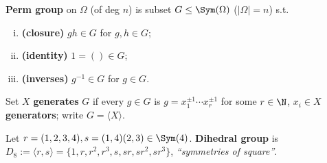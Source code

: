 \begin{slide}
    \begin{definition}
        \vspace{0pt}
        \textbf{Perm group} on $\Omega$ (of deg $n$) is subset $G \leq \Sym(\Omega)$ ($|\Omega| = n$) s.t.
        \begin{enumerate}[(i)]
            \item \textbf{(closure)} $gh \in G$ for $g,h \in G$; \pause
            \item \textbf{(identity)} $1 = () \in G$; \pause
            \item \textbf{(inverses)} $g^{-1} \in G$ for $g \in G$.
        \end{enumerate}
    \end{definition} \pause

    \begin{definition}[generator]
        \vspace{0pt}
        Set $X$ \textbf{generates} $G$ if every $g \in G$ is $g = x_1^{\pm 1} \dotsb x_r^{\pm 1}$ for some $r \in \N$, $x_i \in X$ \textbf{generators}; write $G = \langle X \rangle$.
    \end{definition} \pause

    \begin{example}
        \vspace{0pt}
        Let $r = (1,2,3,4),s = (1,4)(2,3) \in \Sym(4)$. \textbf{Dihedral group} is $D_8 := \langle r,s \rangle = \{1,r,r^2,r^3,s,sr,sr^2,sr^3\}$, \textit{``symmetries of square''}.
    \end{example}
\end{slide}


